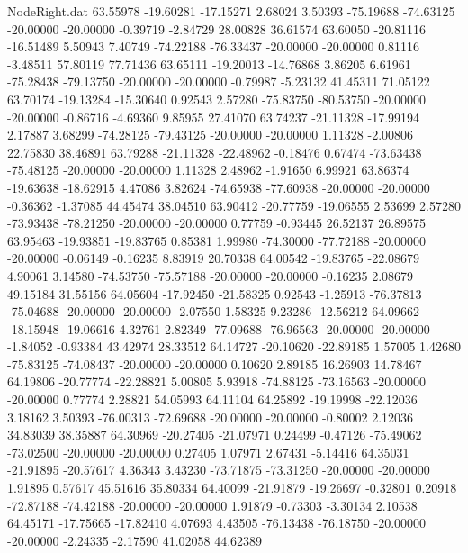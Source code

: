 \begin{filecontents}{NodeRight.dat}
  63.55978  -19.60281  -17.15271     2.68024    3.50393  -75.19688  -74.63125  -20.00000  -20.00000   -0.39719   -2.84729   28.00828   36.61574
  63.60050  -20.81116  -16.51489     5.50943    7.40749  -74.22188  -76.33437  -20.00000  -20.00000    0.81116   -3.48511   57.80119   77.71436
  63.65111  -19.20013  -14.76868     3.86205    6.61961  -75.28438  -79.13750  -20.00000  -20.00000   -0.79987   -5.23132   41.45311   71.05122
  63.70174  -19.13284  -15.30640     0.92543    2.57280  -75.83750  -80.53750  -20.00000  -20.00000   -0.86716   -4.69360    9.85955   27.41070
  63.74237  -21.11328  -17.99194     2.17887    3.68299  -74.28125  -79.43125  -20.00000  -20.00000    1.11328   -2.00806   22.75830   38.46891
  63.79288  -21.11328  -22.48962    -0.18476    0.67474  -73.63438  -75.48125  -20.00000  -20.00000    1.11328    2.48962   -1.91650    6.99921
  63.86374  -19.63638  -18.62915     4.47086    3.82624  -74.65938  -77.60938  -20.00000  -20.00000   -0.36362   -1.37085   44.45474   38.04510
  63.90412  -20.77759  -19.06555     2.53699    2.57280  -73.93438  -78.21250  -20.00000  -20.00000    0.77759   -0.93445   26.52137   26.89575
  63.95463  -19.93851  -19.83765     0.85381    1.99980  -74.30000  -77.72188  -20.00000  -20.00000   -0.06149   -0.16235    8.83919   20.70338
  64.00542  -19.83765  -22.08679     4.90061    3.14580  -74.53750  -75.57188  -20.00000  -20.00000   -0.16235    2.08679   49.15184   31.55156
  64.05604  -17.92450  -21.58325     0.92543   -1.25913  -76.37813  -75.04688  -20.00000  -20.00000   -2.07550    1.58325    9.23286  -12.56212
  64.09662  -18.15948  -19.06616     4.32761    2.82349  -77.09688  -76.96563  -20.00000  -20.00000   -1.84052   -0.93384   43.42974   28.33512
  64.14727  -20.10620  -22.89185     1.57005    1.42680  -75.83125  -74.08437  -20.00000  -20.00000    0.10620    2.89185   16.26903   14.78467
  64.19806  -20.77774  -22.28821     5.00805    5.93918  -74.88125  -73.16563  -20.00000  -20.00000    0.77774    2.28821   54.05993   64.11104
  64.25892  -19.19998  -22.12036     3.18162    3.50393  -76.00313  -72.69688  -20.00000  -20.00000   -0.80002    2.12036   34.83039   38.35887
  64.30969  -20.27405  -21.07971     0.24499   -0.47126  -75.49062  -73.02500  -20.00000  -20.00000    0.27405    1.07971    2.67431   -5.14416
  64.35031  -21.91895  -20.57617     4.36343    3.43230  -73.71875  -73.31250  -20.00000  -20.00000    1.91895    0.57617   45.51616   35.80334
  64.40099  -21.91879  -19.26697    -0.32801    0.20918  -72.87188  -74.42188  -20.00000  -20.00000    1.91879   -0.73303   -3.30134    2.10538
  64.45171  -17.75665  -17.82410     4.07693    4.43505  -76.13438  -76.18750  -20.00000  -20.00000   -2.24335   -2.17590   41.02058   44.62389

\end{filecontents}
